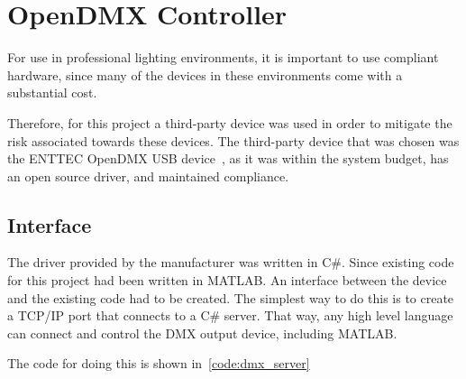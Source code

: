 \section{OpenDMX Controller}
For use in professional lighting environments, it is important to use compliant hardware,
since many of the devices in these environments come with a substantial cost.

Therefore, for this project a third-party device was used in order to mitigate the risk associated towards these devices.
The third-party device that was chosen was the ENTTEC OpenDMX USB device~\cite{ENTTEC},
as it was within the system budget, has an open source driver, and maintained compliance.

\subsection{Interface}
The driver provided by the manufacturer was written in C\#.
Since existing code for this project had been written in MATLAB.
An interface between the device and the existing code had to be created.
The simplest way to do this is to create a TCP/IP port that connects to a C\# server.
That way, any high level language can connect and control the DMX output device, including MATLAB.

The code for doing this is shown in~\autoref{code:dmx_server}


